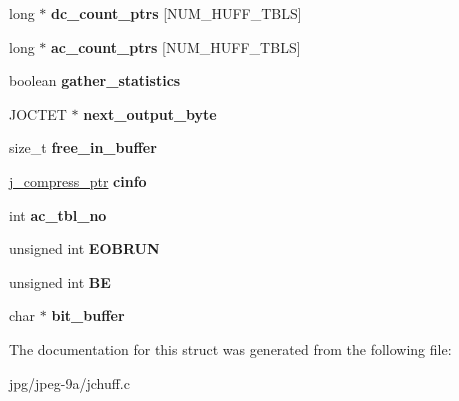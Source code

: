 \begin{DoxyCompactItemize}
\item 
\hypertarget{structhuff__entropy__encoder_aee66f11440e615c95b333d71d3613513}{long $\ast$ {\bfseries dc\+\_\+count\+\_\+ptrs} \mbox{[}N\+U\+M\+\_\+\+H\+U\+F\+F\+\_\+\+T\+B\+L\+S\mbox{]}}\label{structhuff__entropy__encoder_aee66f11440e615c95b333d71d3613513}

\item 
\hypertarget{structhuff__entropy__encoder_acc141b7e17ee817d92b9340d603dde9e}{long $\ast$ {\bfseries ac\+\_\+count\+\_\+ptrs} \mbox{[}N\+U\+M\+\_\+\+H\+U\+F\+F\+\_\+\+T\+B\+L\+S\mbox{]}}\label{structhuff__entropy__encoder_acc141b7e17ee817d92b9340d603dde9e}

\item 
\hypertarget{structhuff__entropy__encoder_ac32b3f950c2755e14bdcdbb9d5c83c82}{boolean {\bfseries gather\+\_\+statistics}}\label{structhuff__entropy__encoder_ac32b3f950c2755e14bdcdbb9d5c83c82}

\item 
\hypertarget{structhuff__entropy__encoder_ad7be281727ae2a6488c8b37b017c1f40}{J\+O\+C\+T\+E\+T $\ast$ {\bfseries next\+\_\+output\+\_\+byte}}\label{structhuff__entropy__encoder_ad7be281727ae2a6488c8b37b017c1f40}

\item 
\hypertarget{structhuff__entropy__encoder_af8e2d1d3eb92b83376c1b6e194e54660}{size\+\_\+t {\bfseries free\+\_\+in\+\_\+buffer}}\label{structhuff__entropy__encoder_af8e2d1d3eb92b83376c1b6e194e54660}

\item 
\hypertarget{structhuff__entropy__encoder_a46ddb16b709ccae209e295480f2d38b6}{\hyperlink{structjpeg__compress__struct}{j\+\_\+compress\+\_\+ptr} {\bfseries cinfo}}\label{structhuff__entropy__encoder_a46ddb16b709ccae209e295480f2d38b6}

\item 
\hypertarget{structhuff__entropy__encoder_a43f8a73e36740cd79fde6e45efef6d16}{int {\bfseries ac\+\_\+tbl\+\_\+no}}\label{structhuff__entropy__encoder_a43f8a73e36740cd79fde6e45efef6d16}

\item 
\hypertarget{structhuff__entropy__encoder_aeec45e042ccea57047e6a7dad5470f2b}{unsigned int {\bfseries E\+O\+B\+R\+U\+N}}\label{structhuff__entropy__encoder_aeec45e042ccea57047e6a7dad5470f2b}

\item 
\hypertarget{structhuff__entropy__encoder_a60927ee1fdfb068cb003c17587770a2b}{unsigned int {\bfseries B\+E}}\label{structhuff__entropy__encoder_a60927ee1fdfb068cb003c17587770a2b}

\item 
\hypertarget{structhuff__entropy__encoder_adc619a5c8cb0398b78fb015c618ffdea}{char $\ast$ {\bfseries bit\+\_\+buffer}}\label{structhuff__entropy__encoder_adc619a5c8cb0398b78fb015c618ffdea}

\end{DoxyCompactItemize}


The documentation for this struct was generated from the following file\+:\begin{DoxyCompactItemize}
\item 
jpg/jpeg-\/9a/jchuff.\+c\end{DoxyCompactItemize}

